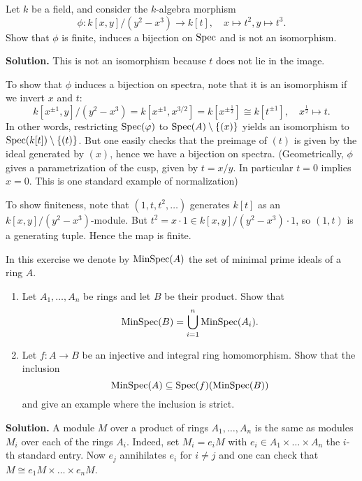 \documentclass[a4paper,11pt]{article}
\begin{document}
Let $k$ be a field, and consider the $k$-algebra morphism
\begin{equation*}
    \phi: k[x,y]/(y^2 - x^3) \to k[t], \quad x \mapsto t^2, y \mapsto t^3.
\end{equation*}
Show that $\phi$ is finite, induces a bijection on $\operatorname{Spec}$ and is not
an isomorphism.

\textbf{Solution.} This is not an isomorphism because $t$ does not lie 
in the image. 

To show that $\phi$ induces a bijection on spectra, note that it is 
an isomorphism if we invert $x$ and $t$:
\begin{equation*}
    k[x^{\pm 1},y]/(y^2 - x^3) = k[x^{\pm 1}, x^{3/2}] 
    = k[x^{\pm \frac 12}] \cong k[t^{\pm 1}] ,\quad x^{\frac 12} \mapsto t.
\end{equation*}
In other words, restricting $\operatorname{Spec}(\varphi)$ to $\operatorname{Spec}(A)\setminus \{(x)\}$
yields an isomorphism to $\operatorname{Spec}(k[t])\setminus \{(t)\}$. But one easily
checks that the preimage of $(t)$ is given by the ideal generated by 
$(x)$, hence we have a bijection on spectra. (Geometrically, $\phi$
gives a parametrization of the cusp, given by $t = x/y$. In particular
$t = 0$ implies $x = 0$. This is one standard example of normalization)

To show finiteness, note that $(1, t, t^2, \dots)$ generates 
$k[t]$ as an $k[x,y]/(y^2-x^3)$-module. But $t^2 = x \cdot 1 \in 
k[x,y]/(y^2-x^3) \cdot 1$, so $(1,t)$ is a generating tuple. Hence the 
map is finite.

In this exercise we denote by $\operatorname{MinSpec}(A)$ the set of minimal prime ideals
of a ring $A$. 
\begin{enumerate}
    \item Let $A_1, \dots, A_n$ be rings and let $B$ be their product.
        Show that 
        \begin{equation*}
            \operatorname{MinSpec}(B) = \bigcup_{i = 1}^n \operatorname{MinSpec}(A_i).
        \end{equation*}
    \item Let $f: A\to B$ be an injective and integral ring homomorphism.
        Show that the inclusion
        \begin{equation*}
            \operatorname{MinSpec}(A) \subseteq \operatorname{Spec}(f)(\operatorname{MinSpec}(B))
        \end{equation*}
        and give an example where the inclusion is strict. 
\end{enumerate}
\textbf{Solution.} A module $M$ over a product of rings 
$A_1, \dots, A_n$ is the same as modules $M_i$ over each of the rings 
$A_i$. Indeed, set $M_i = e_i M$ with $e_i \in A_1 \times \dots \times A_n$
the $i$-th standard entry. Now $e_j$ annihilates $e_i$ for $i \neq j$
and one can check that $M \cong e_1 M \times \dots \times e_n M$. 
\end{document}
